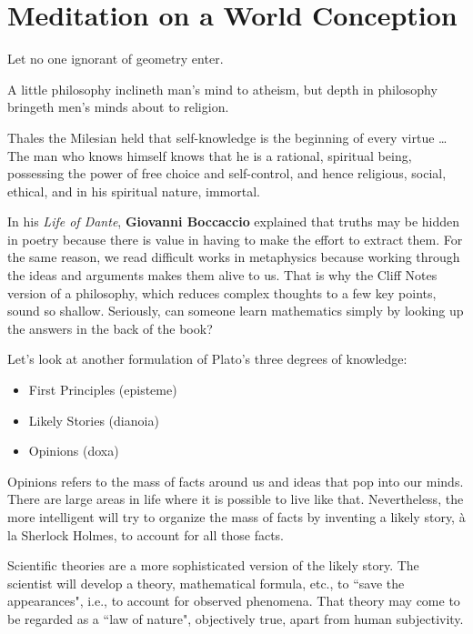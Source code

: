 \section{Meditation on a World Conception}

\begin{quotex}
Let no one ignorant of geometry enter. 

A little philosophy inclineth man's mind to atheism, but depth in philosophy bringeth men's minds about to religion. 

Thales the Milesian held that self-knowledge is the beginning of every virtue … The man who knows himself knows that he is a rational, spiritual being, possessing the power of free choice and self-control, and hence religious, social, ethical, and in his spiritual nature, immortal. 

\end{quotex}
In his \emph{Life of Dante}, \textbf{Giovanni Boccaccio} explained that truths may be hidden in poetry because there is value in having to make the effort to extract them. For the same reason, we read difficult works in metaphysics because working through the ideas and arguments makes them alive to us. That is why the Cliff Notes version of a philosophy, which reduces complex thoughts to a few key points, sound so shallow. Seriously, can someone learn mathematics simply by looking up the answers in the back of the book?

Let's look at another formulation of Plato's three degrees of knowledge:

\begin{itemize}
\item First Principles (episteme) 
\item Likely Stories (dianoia) 
\item Opinions (doxa) 
\end{itemize}
Opinions refers to the mass of facts around us and ideas that pop into our minds. There are large areas in life where it is possible to live like that. Nevertheless, the more intelligent will try to organize the mass of facts by inventing a likely story, à la Sherlock Holmes, to account for all those facts.

Scientific theories are a more sophisticated version of the likely story. The scientist will develop a theory, mathematical formula, etc., to ``save the appearances", i.e., to account for observed phenomena. That theory may come to be regarded as a ``law of nature", objectively true, apart from human subjectivity.

